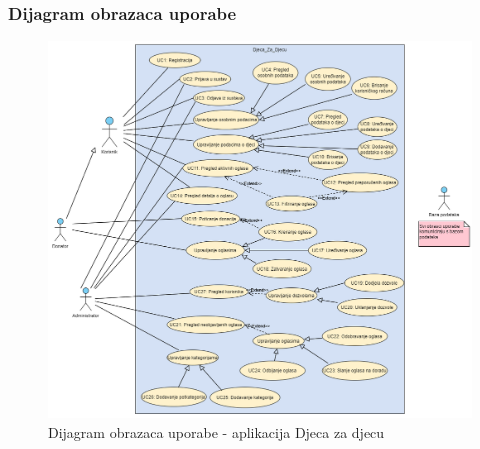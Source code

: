 				\eject
				\subsubsection{Dijagram obrazaca uporabe}
					\begin{figure}[H]
						\includegraphics[width=\textwidth,height=0.7\textheight]{dijagrami/UCD - Djeca za djecu.png}
						\centering
						\caption{Dijagram obrazaca uporabe - aplikacija Djeca za djecu}
						\label{fig:useCaseDiagramMain}
					\end{figure}
				\eject
				
